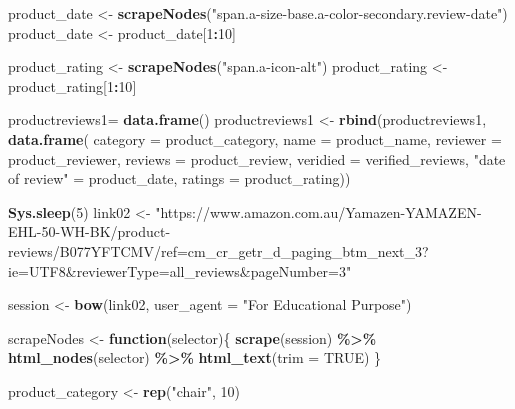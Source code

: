 \documentclass[
]{article}
\newenvironment{Shaded}{\begin{snugshade}}{\end{snugshade}}
\newcommand{\AttributeTok}[1]{\textcolor[rgb]{0.13,0.29,0.53}{#1}}
\newcommand{\ConstantTok}[1]{\textcolor[rgb]{0.56,0.35,0.01}{#1}}
\newcommand{\ControlFlowTok}[1]{\textcolor[rgb]{0.13,0.29,0.53}{\textbf{#1}}}
\newcommand{\DecValTok}[1]{\textcolor[rgb]{0.00,0.00,0.81}{#1}}
\newcommand{\FunctionTok}[1]{\textcolor[rgb]{0.13,0.29,0.53}{\textbf{#1}}}
\newcommand{\NormalTok}[1]{#1}
\newcommand{\OtherTok}[1]{\textcolor[rgb]{0.56,0.35,0.01}{#1}}
\newcommand{\SpecialCharTok}[1]{\textcolor[rgb]{0.81,0.36,0.00}{\textbf{#1}}}
\newcommand{\StringTok}[1]{\textcolor[rgb]{0.31,0.60,0.02}{#1}}
\begin{document}
\begin{Shaded}
\begin{Highlighting}[]
\NormalTok{  product\_date }\OtherTok{\textless{}{-}} \FunctionTok{scrapeNodes}\NormalTok{(}\StringTok{"span.a{-}size{-}base.a{-}color{-}secondary.review{-}date"}\NormalTok{)}
\NormalTok{  product\_date }\OtherTok{\textless{}{-}}\NormalTok{ product\_date[}\DecValTok{1}\SpecialCharTok{:}\DecValTok{10}\NormalTok{]}
  
\NormalTok{  product\_rating }\OtherTok{\textless{}{-}} \FunctionTok{scrapeNodes}\NormalTok{(}\StringTok{"span.a{-}icon{-}alt"}\NormalTok{)}
\NormalTok{  product\_rating }\OtherTok{\textless{}{-}}\NormalTok{ product\_rating[}\DecValTok{1}\SpecialCharTok{:}\DecValTok{10}\NormalTok{]}
  
\NormalTok{  productreviews1}\OtherTok{=} \FunctionTok{data.frame}\NormalTok{()}
\NormalTok{  productreviews1 }\OtherTok{\textless{}{-}} \FunctionTok{rbind}\NormalTok{(productreviews1, }\FunctionTok{data.frame}\NormalTok{(}
                      \AttributeTok{category =}\NormalTok{ product\_category,}
                      \AttributeTok{name =}\NormalTok{ product\_name,}
                      \AttributeTok{reviewer =}\NormalTok{ product\_reviewer,}
                      \AttributeTok{reviews =}\NormalTok{ product\_review,}
                      \AttributeTok{veridied =}\NormalTok{ verified\_reviews,}
                      \StringTok{"date of review"} \OtherTok{=}\NormalTok{ product\_date,}
                      \AttributeTok{ratings =}\NormalTok{ product\_rating))}

  
 \FunctionTok{Sys.sleep}\NormalTok{(}\DecValTok{5}\NormalTok{)}
\NormalTok{link02 }\OtherTok{\textless{}{-}} \StringTok{"https://www.amazon.com.au/Yamazen{-}YAMAZEN{-}EHL{-}50{-}WH{-}BK/product{-}reviews/B077YFTCMV/ref=cm\_cr\_getr\_d\_paging\_btm\_next\_3?ie=UTF8\&reviewerType=all\_reviews\&pageNumber=3"}


\NormalTok{  session }\OtherTok{\textless{}{-}} \FunctionTok{bow}\NormalTok{(link02,}
               \AttributeTok{user\_agent =} \StringTok{"For Educational Purpose"}\NormalTok{)}

\NormalTok{  scrapeNodes }\OtherTok{\textless{}{-}} \ControlFlowTok{function}\NormalTok{(selector)\{}
    \FunctionTok{scrape}\NormalTok{(session) }\SpecialCharTok{\%\textgreater{}\%}
      \FunctionTok{html\_nodes}\NormalTok{(selector) }\SpecialCharTok{\%\textgreater{}\%}
      \FunctionTok{html\_text}\NormalTok{(}\AttributeTok{trim =} \ConstantTok{TRUE}\NormalTok{)}
\NormalTok{  \}}

\NormalTok{  product\_category }\OtherTok{\textless{}{-}} \FunctionTok{rep}\NormalTok{(}\StringTok{"chair"}\NormalTok{, }\DecValTok{10}\NormalTok{)}


\end{Highlighting}
\end{Shaded}
\end{document}
